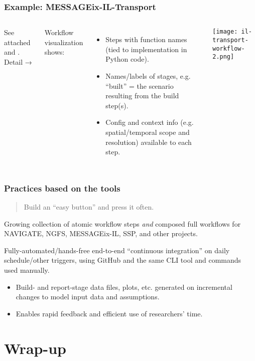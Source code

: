 \documentclass[12pt,aspectratio=169]{beamer}
\begin{document}
\begin{frame}
\frametitle{Example: MESSAGEix-IL-Transport}

\begin{columns}
\column{0.45\paperwidth}

See attached  and .
Detail →

\bigskip
Workflow visualization shows:
\begin{itemize}
  \item Steps with function names (tied to implementation in Python code).
  \item Names/labels of stages, e.g. “built” = the scenario resulting from the build step(s).
  \item Config and context info (e.g. spatial/temporal scope and resolution) available to each step.
\end{itemize}
\column{0.45\paperwidth}
\texttt{[image: il-transport-workflow-2.png]}
\end{columns}
\end{frame}

\begin{frame}
\frametitle{Practices based on the tools}

\begin{quote}
  Build an “easy button” and press it often.
\end{quote}

\bigskip
Growing collection of atomic workflow steps \emph{and} composed full workflows for NAVIGATE, NGFS, MESSAGEix-IL, SSP, and other projects.

\bigskip
Fully-automated/hands-free end-to-end “continuous integration” on daily schedule/other triggers, using GitHub and the same CLI tool and commands used manually.
\begin{itemize}
  \item Build- and report-stage data files, plots, etc. generated on incremental changes to model input data and assumptions.
  \item Enables rapid feedback and efficient use of researchers' time.
\end{itemize}

\end{frame}

\section*{Wrap-up}
\end{document}
